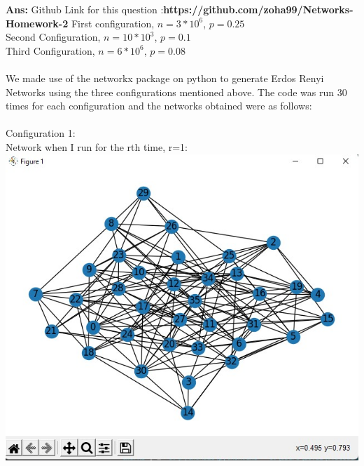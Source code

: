 \documentclass[answers]{exam}
\begin{document}
\begin{questions}
\begin{framed}
\textbf{Ans:} Github Link for this question :\textbf{https://github.com/zoha99/Networks-Homework-2}
First configuration, $n=3*10^6$, $p=0.25$\\Second Configuration, $n=10*10^3$, $p=0.1$ \\Third Configuration, $n=6*10^6$, $p=0.08$\\\\We made use of the networkx package on python to generate Erdos Renyi Networks using the three configurations mentioned above. The code was run 30 times for each configuration and the networks obtained were as follows:
\\\\
Configuration 1:\\Network when I run for the rth time, r=1:\\
\includegraphics[width=10 cm]{first conf 1.jpg}\\


\end{framed}
\end{questions}
\end{document}
